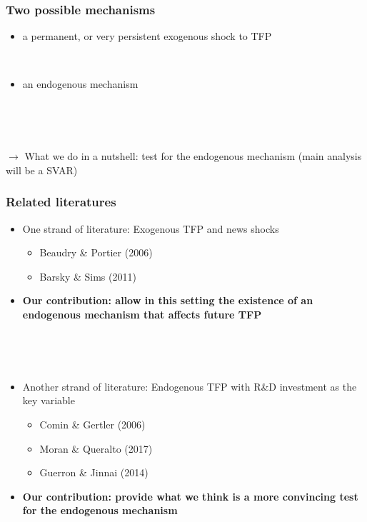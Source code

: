 \documentclass{beamer}
\begin{document}
\begin{frame}
	\frametitle{Two possible mechanisms}
	
\begin{itemize}
\item a permanent, or very persistent exogenous shock to TFP

\

\item an endogenous mechanism
\end{itemize}	

\

\

$\rightarrow$ What we do in a nutshell: test for the endogenous mechanism (main analysis will be a SVAR)


\end{frame}


\begin{frame}
	\frametitle{Related literatures}
	\label{related_lit}
\begin{itemize}
\item One strand of literature: Exogenous TFP and news shocks
	\begin{itemize}
	\item Beaudry \& Portier (2006)
	\item Barsky \& Sims (2011)
	
	\end{itemize}
\item [] \textbf{Our contribution: allow in this setting the existence of an endogenous mechanism that affects future TFP}	


\hyperlink{BS_quote}{}

	\
	
	\
	
\item Another strand of literature: Endogenous TFP with R\&D investment as the key variable
	\begin{itemize}
	\item Comin \& Gertler (2006)
	\item Moran \& Queralto (2017)
	\item  Guerron \& Jinnai (2014)
	
	\end{itemize}	


\item []  \textbf{Our contribution: provide what we think is a more convincing test for the endogenous mechanism}


\end{itemize}



\end{frame}
\end{document}

